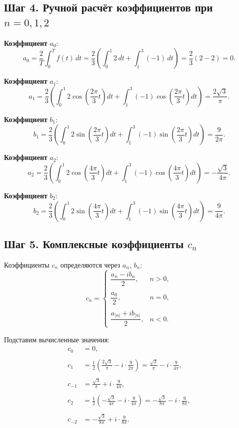 \subsection*{Шаг 4. Ручной расчёт коэффициентов при $n = 0, 1, 2$}

\textbf{Коэффициент } $a_0$:
\[
a_0 = \frac{2}{T} \int_{0}^{T} f(t) \, dt = \frac{2}{3} \left( \int_0^1 2\,dt + \int_1^3 (-1)\,dt \right)
= \frac{2}{3}(2 - 2) = 0.
\]

\textbf{Коэффициент } $a_1$:
\[
a_1 = \frac{2}{3} \left( \int_0^1 2\cos\left( \frac{2\pi}{3} t \right) dt + \int_1^3 (-1)\cos\left( \frac{2\pi}{3} t \right) dt \right)
= \frac{2\sqrt{3}}{\pi}.
\]

\textbf{Коэффициент } $b_1$:
\[
b_1 = \frac{2}{3} \left( \int_0^1 2\sin\left( \frac{2\pi}{3} t \right) dt + \int_1^3 (-1)\sin\left( \frac{2\pi}{3} t \right) dt \right)
= \frac{9}{2\pi}.
\]

\textbf{Коэффициент } $a_2$:
\[
a_2 = \frac{2}{3} \left( \int_0^1 2\cos\left( \frac{4\pi}{3} t \right) dt + \int_1^3 (-1)\cos\left( \frac{4\pi}{3} t \right) dt \right)
= -\frac{\sqrt{3}}{4\pi}.
\]

\textbf{Коэффициент } $b_2$:
\[
b_2 = \frac{2}{3} \left( \int_0^1 2\sin\left( \frac{4\pi}{3} t \right) dt + \int_1^3 (-1)\sin\left( \frac{4\pi}{3} t \right) dt \right)
= \frac{9}{4\pi}.
\]

\subsection*{Шаг 5. Комплексные коэффициенты $c_n$}

Коэффициенты $c_n$ определяются через $a_n$, $b_n$:
\[
c_n =
\begin{cases}
\dfrac{a_n - i b_n}{2}, & n > 0, \\\\
\dfrac{a_0}{2}, & n = 0, \\\\
\dfrac{a_{|n|} + i b_{|n|}}{2}, & n < 0.
\end{cases}
\]

Подставим вычисленные значения:
\begin{align*}
c_0 &= 0, \\\\
c_1 &= \frac{1}{2} \left( \frac{2\sqrt{3}}{\pi} - i \cdot \frac{9}{2\pi} \right) = \frac{\sqrt{3}}{\pi} - i \cdot \frac{9}{4\pi}, \\\\
c_{-1} &= \frac{\sqrt{3}}{\pi} + i \cdot \frac{9}{4\pi}, \\\\
c_2 &= \frac{1}{2} \left( -\frac{\sqrt{3}}{4\pi} - i \cdot \frac{9}{4\pi} \right) = -\frac{\sqrt{3}}{8\pi} - i \cdot \frac{9}{8\pi}, \\\\
c_{-2} &= -\frac{\sqrt{3}}{8\pi} + i \cdot \frac{9}{8\pi}.
\end{align*}

